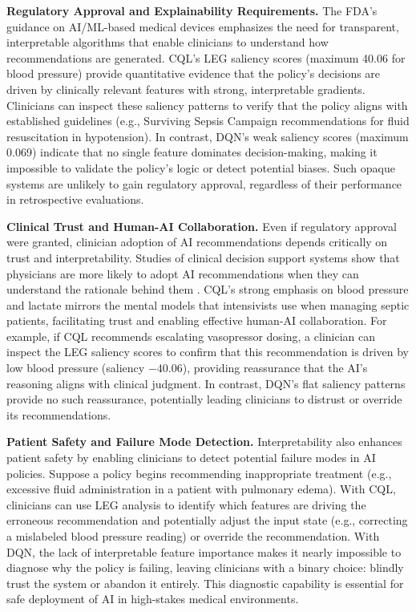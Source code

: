 \textbf{Regulatory Approval and Explainability Requirements.} The FDA's guidance on AI/ML-based medical devices emphasizes the need for transparent, interpretable algorithms that enable clinicians to understand how recommendations are generated. CQL's LEG saliency scores (maximum 40.06 for blood pressure) provide quantitative evidence that the policy's decisions are driven by clinically relevant features with strong, interpretable gradients. Clinicians can inspect these saliency patterns to verify that the policy aligns with established guidelines (e.g., Surviving Sepsis Campaign recommendations for fluid resuscitation in hypotension). In contrast, DQN's weak saliency scores (maximum 0.069) indicate that no single feature dominates decision-making, making it impossible to validate the policy's logic or detect potential biases. Such opaque systems are unlikely to gain regulatory approval, regardless of their performance in retrospective evaluations.

\textbf{Clinical Trust and Human-AI Collaboration.} Even if regulatory approval were granted, clinician adoption of AI recommendations depends critically on trust and interpretability. Studies of clinical decision support systems show that physicians are more likely to adopt AI recommendations when they can understand the rationale behind them \citep{shortliffe2018cdss}. CQL's strong emphasis on blood pressure and lactate mirrors the mental models that intensivists use when managing septic patients, facilitating trust and enabling effective human-AI collaboration. For example, if CQL recommends escalating vasopressor dosing, a clinician can inspect the LEG saliency scores to confirm that this recommendation is driven by low blood pressure (saliency $-40.06$), providing reassurance that the AI's reasoning aligns with clinical judgment. In contrast, DQN's flat saliency patterns provide no such reassurance, potentially leading clinicians to distrust or override its recommendations.

\textbf{Patient Safety and Failure Mode Detection.} Interpretability also enhances patient safety by enabling clinicians to detect potential failure modes in AI policies. Suppose a policy begins recommending inappropriate treatment (e.g., excessive fluid administration in a patient with pulmonary edema). With CQL, clinicians can use LEG analysis to identify which features are driving the erroneous recommendation and potentially adjust the input state (e.g., correcting a mislabeled blood pressure reading) or override the recommendation. With DQN, the lack of interpretable feature importance makes it nearly impossible to diagnose why the policy is failing, leaving clinicians with a binary choice: blindly trust the system or abandon it entirely. This diagnostic capability is essential for safe deployment of AI in high-stakes medical environments.

